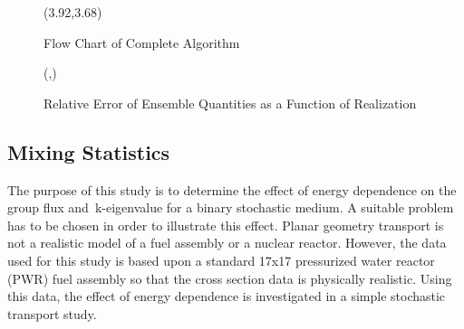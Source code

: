 	\begin{figure}[htbp]
		\begin{center}
			\begin{minipage}[t]{4in}
			\centering
			\begin{picture}(3.92,3.68)
			\end{picture}
			\caption{\label{fig:Flow-Chart3} Flow Chart of Complete Algorithm}
			\end{minipage} %
		\end{center}
	\end{figure}
	
	\begin{figure}[htbp]
		\begin{center}
			\begin{minipage}[t]{6in}
			\centering
			\begin{picture}(\width,\height)
			\end{picture}
			\caption{\label{fig:Rel-Err} Relative Error of Ensemble Quantities as a Function of
				Realization}
			\end{minipage} %
		\end{center}
	\end{figure}	
	
\belowSubSecSkip

\subsection{Mixing Statistics}
\label{sec:StochMedTrans-Mixing}

\noindent
	\indent The purpose of this study is to determine the effect of energy dependence on the group flux
	and~k-eigenvalue for a binary stochastic medium.  A suitable problem has to be chosen in order 
	to illustrate this effect.  Planar geometry transport is not a realistic model of a fuel assembly or
	a nuclear reactor.  However, the data used for this study is based upon a standard 17x17 pressurized
	water reactor (PWR) fuel assembly so that the cross section data is physically realistic.
	Using this data, the effect of energy dependence is investigated in a simple stochastic transport study.
	
